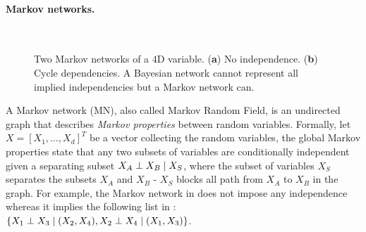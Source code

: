 \paragraph{Markov networks.}
\begin{figure}
    \centering
    \begin{subfigure}{.45\textwidth}
        \centering
        \caption{}\label{fig:MN-fig-a}
    \end{subfigure}~\hspace{-4.8em}
    \begin{subfigure}{.45\textwidth}
    \centering
        \caption{}\label{fig:MN-fig-b}
    \end{subfigure}
    \caption{Two Markov networks of a $4$D variable. (\textbf{a}) No independence. (\textbf{b}) Cycle dependencies. A Bayesian network cannot represent all implied independencies but a Markov network can.} \label{fig:MN-fig}
\end{figure}
A Markov network (MN), also called Markov Random Field, is an undirected graph that describes \textit{Markov properties} between random variables. Formally, let $X = \left[X_1, \hdots, X_d\right]^T$ be a vector collecting the random variables, the global Markov properties state that any two subsets of variables are conditionally independent given a separating subset $X_A \perp X_B \mid X_S$, where the subset of variables $X_S$ separates the subsets $X_A$ and $X_B$ - $X_S$ blocks all path from $X_A$ to $X_B$ in the graph. For example, the Markov network in  does not impose any independence whereas it implies the following list in : $\{ X_1 \perp X_3 \mid (X_2, X_4), X_2 \perp X_4 \mid (X_1, X_3)\}$.

